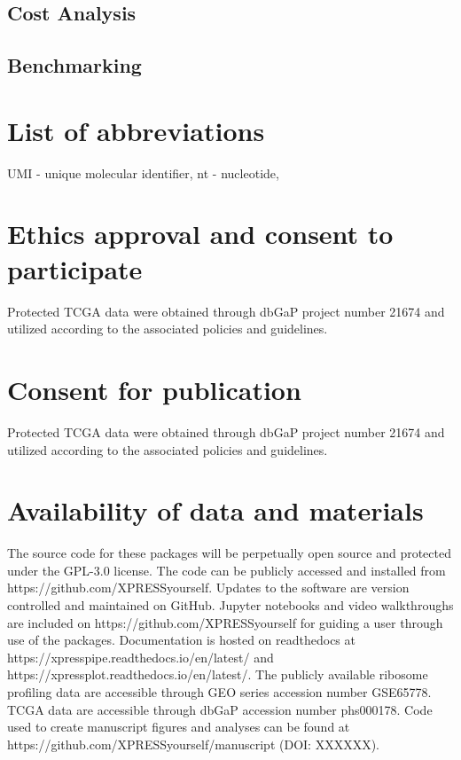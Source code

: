 \documentclass[11pt, a4paper, oneside]{article}
\begin{document}
\subsection{Cost Analysis}


\subsection{Benchmarking}




\section*{List of abbreviations}
UMI - unique molecular identifier, nt - nucleotide,

\section*{Ethics approval and consent to participate}
Protected TCGA data were obtained through dbGaP project number 21674 and utilized according to the associated policies and guidelines.

\section*{Consent for publication}
Protected TCGA data were obtained through dbGaP project number 21674 and utilized according to the associated policies and guidelines.

\section*{Availability of data and materials}
The source code for these packages will be perpetually open source and protected under the GPL-3.0 license. The code can be publicly accessed and installed from https://github.com/XPRESSyourself. Updates to the software are version controlled and maintained on GitHub. Jupyter notebooks and video walkthroughs are included on https://github.com/XPRESSyourself for guiding a user through use of the packages. Documentation is hosted on readthedocs \cite{readthedocs} at https://xpresspipe.readthedocs.io/en/latest/ and https://xpressplot.readthedocs.io/en/latest/. The publicly available ribosome profiling data are accessible through GEO series accession number GSE65778. TCGA data are accessible through dbGaP accession number phs000178. Code used to create manuscript figures and analyses can be found at https://github.com/XPRESSyourself/manuscript (DOI: XXXXXX).
\end{document}
